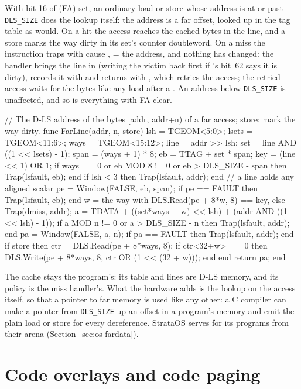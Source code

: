 With bit 16 of  (FA) set, an ordinary load or store whose address is at or past
\texttt{DLS\_SIZE} does the lookup itself: the address is a far offset, looked up in the tag table as
 would. On a hit the access reaches the cached bytes in the line, and a store marks the way
dirty in its set's counter doubleword. On a miss the instruction traps with cause ,
 = the address, and nothing has changed: the handler brings the line in (writing the victim
back first if 's bit~62 says it is dirty), records it with  and returns with
, which retries the access; the retried access waits for the bytes like any load after a
. An address below \texttt{DLS\_SIZE} is unaffected, and so is everything with FA clear.

\begin{pseudo}
// The D-LS address of the bytes [addr, addr+n) of a far access; store: mark the way dirty.
func FarLine(addr, n, store)
    lsh = TGEOM<5:0>; lsets = TGEOM<11:6>; ways = TGEOM<15:12>;
    line = addr >> lsh;  set = line AND ((1 << lsets) - 1);
    span = (ways + 1) * 8;  eb = TTAG + set * span;  key = (line << 1) OR 1;
    if ways == 0 or eb MOD 8 != 0 or eb > DLS_SIZE - span then Trap(lsfault, eb); end
    if lsh < 3 then Trap(lsfault, addr); end               // a line holds any aligned scalar
    pe = Window(FALSE, eb, span);
    if pe == FAULT then Trap(lsfault, eb); end
    w = the way with DLS.Read(pe + 8*w, 8) == key, else Trap(dmiss, addr);
    a = TDATA + ((set*ways + w) << lsh) + (addr AND ((1 << lsh) - 1));
    if a MOD n != 0 or a > DLS_SIZE - n then Trap(lsfault, addr); end
    pa = Window(FALSE, a, n);
    if pa == FAULT then Trap(lsfault, addr); end
    if store then
        ctr = DLS.Read(pe + 8*ways, 8);
        if ctr<32+w> == 0 then DLS.Write(pe + 8*ways, 8, ctr OR (1 << (32 + w))); end
    end
    return pa;
end
\end{pseudo}

The cache stays the program's: its table and lines are D-LS memory, and its policy is the miss
handler's. What the hardware adds is the lookup on the access itself, so that a pointer to far memory
is used like any other: a C compiler can make a pointer from \texttt{DLS\_SIZE} up an offset in a
program's memory and emit the plain load or store for every dereference. StrataOS serves 
for its programs from their arena (Section~\ref{sec:os-fardata}).

\section{Code overlays and code paging}\label{sec:overlays}

